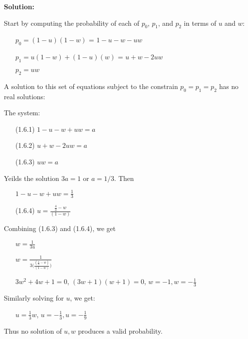 \documentclass{article}
\begin{document}
\textbf{Solution:} {
Start by computing the probability of each of $p_0$, $p_1$, and $p_2$ in terms of $u$ and $w$:
   
    \begin{itemize}
        \item[] $p_0 = (1-u)(1-w)$ = $1 - u - w - uw$
        \item[] $p_1 = u(1-w) + (1-u)(w)$ = $u + w - 2uw$
        \item[] $p_2 = uw$
    \end{itemize}

A solution to this set of equations subject to the constrain $p_0 = p_1 = p_2$ has no real solutions:

The system:
    \begin{itemize}
        \item[(1.6.1)] $1 - u - w + uw = a$
        \item[(1.6.2)] $u + w - 2uw  = a$
        \item[(1.6.3)] $uw = a$
    \end{itemize}
Yeilds the solution $3a = 1$ or $a = 1/3$. Then
    \begin{itemize}
        \item[] $1 - u - w + uw = \frac{1}{3}$
        \item[(1.6.4)] $ u = \frac{\frac{4}{3} - w}{(1-w)}$
    \end{itemize}
Combining (1.6.3) and (1.6.4), we get
    \begin{itemize}
        \item[] $w = \frac{1}{3u}$
        \item[] $w = \frac{1}{3\big(\frac{(\frac{4}{3}-w)}{(1-w)}\big)} $
        \item[] $3w^2 + 4w + 1 = 0 $, $(3w+1)(w+1) = 0$, $w = -1, w =-\frac{1}{3}$
    \end{itemize}
Similarly solving for $u$, we get:
    \begin{itemize}
        \item[] $u = \frac{1}{3}w$, $u = -\frac{1}{3}, u = -\frac{1}{9}$ 
    \end{itemize}
Thus no solution of $u, w$ produces a valid probability.

}
\end{document}
